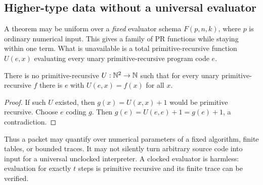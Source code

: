 \subsection{Higher-type data without a universal evaluator}

A theorem may be uniform over a \emph{fixed} evaluator schema
\(F(p,n,k)\), where \(p\) is ordinary numerical input.  This gives a family of
PR functions while staying within one  term.  What is unavailable is
a total primitive-recursive function \(U(e,x)\) evaluating every unary
primitive-recursive program code \(e\).

\begin{proposition}
There is no primitive-recursive \(U:\mathbb N^2\to\mathbb N\) such that for every unary
primitive-recursive \(f\) there is \(e\) with \(U(e,x)=f(x)\) for all \(x\).
\end{proposition}

\begin{proof}
If such \(U\) existed, then \(g(x)=U(x,x)+1\) would be primitive recursive.
Choose \(e\) coding \(g\).  Then
\(g(e)=U(e,e)+1=g(e)+1\), a contradiction.
\end{proof}

Thus a packet may quantify over numerical parameters of a fixed algorithm,
finite tables, or bounded traces.  It may not silently turn arbitrary source
code into input for a universal unclocked interpreter.  A clocked evaluator
is harmless: evaluation for exactly \(t\) steps is primitive recursive and
its finite trace can be verified.
